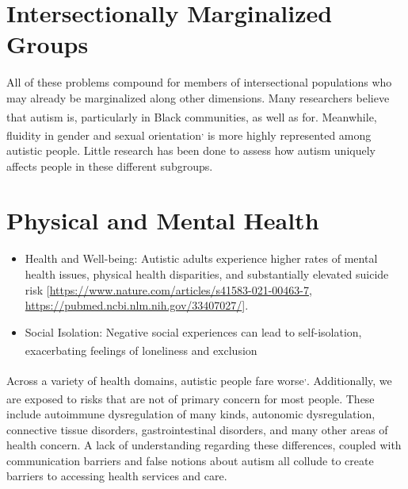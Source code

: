 \documentclass[
  letterpaper,
  DIV=11,
  numbers=noendperiod]{scrreprt}
\providecommand{\tightlist}{%
  \setlength{\itemsep}{0pt}\setlength{\parskip}{0pt}}\usepackage{longtable,booktabs,array}
\begin{document}
\section{Intersectionally Marginalized Groups}\label{sec-marginalized}

All of these problems compound for members of intersectional populations
who may already be marginalized along other dimensions. Many researchers
believe that autism is\textsuperscript{},
particularly in Black
communities\textsuperscript{}, as well as
for\textsuperscript{}. Meanwhile, fluidity
in gender and sexual
orientation\textsuperscript{,}
is more highly represented among autistic people. Little research has
been done to assess how autism uniquely affects people in these
different subgroups.

\section{Physical and Mental Health}\label{sec-physical_mental_health}

\begin{itemize}
\tightlist
\item
  Health and Well-being: Autistic adults experience higher rates of
  mental health issues, physical health disparities, and substantially
  elevated suicide risk
  {[}\url{https://www.nature.com/articles/s41583-021-00463-7},
  \url{https://pubmed.ncbi.nlm.nih.gov/33407027/}{]}.
\item
  Social Isolation: Negative social experiences can lead to
  self-isolation, exacerbating feelings of loneliness and
  exclusion\textsuperscript{}
\end{itemize}

Across a variety of health domains, autistic people fare
worse\textsuperscript{,}.
Additionally, we are exposed to risks that are not of primary concern
for most people\textsuperscript{}. These
include autoimmune dysregulation of many kinds, autonomic dysregulation,
connective tissue disorders, gastrointestinal disorders, and many other
areas of health concern. A lack of understanding regarding these
differences, coupled with communication barriers and false notions about
autism all collude to create barriers to accessing health services and
care.
\end{document}
